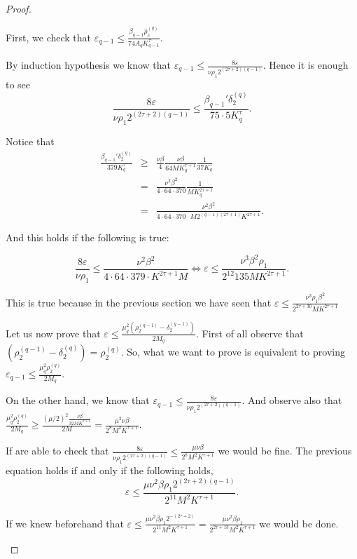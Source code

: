 \begin{proof}
\begin{enumerate}
\begin{itemize}
 First, we  check that $\varepsilon_{q-1} \leq \frac{\beta_{q-1}\hat\rho_c^{(q)}}{74 A_q K_{q-1}^\tau}$.

 By induction hypothesis we know that $\varepsilon_{q-1} \leq \frac{8\varepsilon}{\nu \rho_1 2^{(2\tau+2)(q-1)}}$. Hence it is enough to see
 $$\frac{8\varepsilon}{\nu \rho_1 2^{(2\tau+2)(q-1)}} \leq \frac{\beta_{q-1}' \delta_2^{(q)}}{75\cdot 5 K_q^\tau}.$$

 Notice that
 $$
 \begin{array}{rcl}
 \frac{\beta_{q-1}' \delta_2^{(q)}}{379 K_q^\tau} & \geq & \frac{\nu \beta}{4}\frac{\nu \beta}{64 M K_q^{\tau+1}}\frac{1}{37 K_q^\tau} \\
 & = & \frac{\nu^2 \beta^2}{4\cdot 64 \cdot 370}\frac{1}{M K_q^{2\tau+1}}\\
 & = & \frac{\nu^2\beta^2}{4\cdot 64 \cdot 370 \cdot M 2^{(q-1)(2\tau+1)} K^{2\tau+1}}.
 \end{array}
$$

And this holds if the following is true:

$$\frac{8 \varepsilon}{\nu \rho_1} \leq \frac{\nu^2 \beta^2}{4\cdot 64 \cdot 379 \cdot K^{2\tau + 1} M}\Leftrightarrow \varepsilon \leq \frac{\nu^3 \beta^2 \rho_1}{2^{12} 135 M K^{2\tau+1}}.$$

This is true because in the previous section we have seen that $\varepsilon \leq \frac{\nu^3 \rho_1 \beta^2}{2^{2\tau+30}M K^{2\tau+1}}$


 Let us now prove that $\varepsilon \leq \frac{\mu_q^2 (\rho_2^{(q-1)} - \delta_2^{(q-1)})}{2 M_q}$. First of all observe that $(\rho_2^{(q-1)} - \delta_2^{(q)}) = \rho_2^{(q)}$.
 So, what we want to prove is equivalent to proving $\varepsilon_{q-1}\leq \frac{\mu_q^2 \rho_2^{(q)}}{2 M_q}$.

 On the other hand, we know that $\varepsilon_{q-1}\leq \frac{8\varepsilon}{\nu \rho_1 2^{(2\tau + 2)(q-1)}}$. And observe also that $\frac{\mu_q^2 \rho_2^{(q)}}{2M_q} \geq \frac{(\mu/2)^2\frac{\nu\beta}{32 M K^{\tau+1}}}{2M} = \frac{\mu^2 \nu \beta}{2^8 M^2 K^{\tau+1}}$.

 If are able to check that $\frac{8\varepsilon}{\nu \rho_1 2^{(2\tau+2)(q-1)}} \leq \frac{\mu\nu\beta}{2^8 M^2 K^{\tau+1}}$ we would be fine. The previous equation holds if and only if the following holds,
 $$\varepsilon \leq \frac{\mu \nu^2 \beta \rho_1 2^{(2\tau+2)(q-1)}}{2^{11}M^2 K^{\tau+1}}.$$

If we knew beforehand that $\varepsilon \leq \frac{\mu \nu^2 \beta \rho_1 2^{-(2\tau+2)}}{2^{11}M^2 K^{\tau+1}} = \frac{\mu \nu^2 \beta \rho_1}{2^{2\tau+13}M^2 K^{\tau+1}}$ we would be done.


\end{itemize}
\end{enumerate}
\end{proof}
